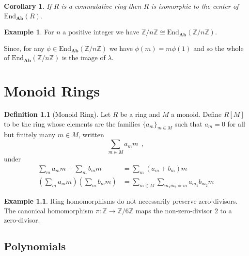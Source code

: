 \documentclass{book}
\newtheorem{cor}{Corollary}[prop]
\theoremstyle{definition}
\newtheorem{df}[prop]{Definition}
\newtheorem{ex}[prop]{Example}
\newcommand{\Ab}{\ensuremath{\mathbf{Ab}}}
\newcommand{\End}[2]{\ensuremath{\mathrm{End}_{#1} \left( {#2} \right)}}
\begin{document}
\begin{cor}
If $R$ is a commutative ring then $R$ is isomorphic to the center of $\End{\Ab}{R}$.
\end{cor}

\begin{ex}
For $n$ a positive integer we have $\mathbb{Z} / n \mathbb{Z} \cong \End{\Ab}{\mathbb{Z} / n \mathbb{Z}}$.

Since, for any $\phi \in \End{\Ab}{\mathbb{Z} / n \mathbb{Z}}$ we have $\phi(m) = m \phi(1)$ and so the whole of $\End{\Ab}{\mathbb{Z} / n \mathbb{Z}}$ is the image of $\lambda$.
\end{ex}


\chapter{Monoid Rings}

\begin{df}[Monoid Ring]
Let $R$ be a ring and $M$ a monoid. Define $R[M]$ to be the ring whose elements are the families $\{ a_m \}_{m \in M}$ such that $a_m = 0$ for all but finitely many $m \in M$, written
\[ \sum_{m \in M} a_m m \enspace , \]
under
\begin{align*}
\sum_m a_m m + \sum_m b_m m & = \sum_m (a_m + b_m) m \\
\left( \sum_m a_m m \right) \left( \sum_m b_m m \right) & = \sum_{m \in M} \sum_{m_1 m_2 = m} a_{m_1} b_{m_2} m
\end{align*}
\end{df}

\begin{ex}
Ring homomorphisms do not necessarily preserve zero-divisors. The canonical homomorphism $\pi : \mathbb{Z} \rightarrow \mathbb{Z} / 6 \mathbb{Z}$ maps the non-zero-divisor 2 to a zero-divisor.
\end{ex}

\section{Polynomials}
\end{document}
